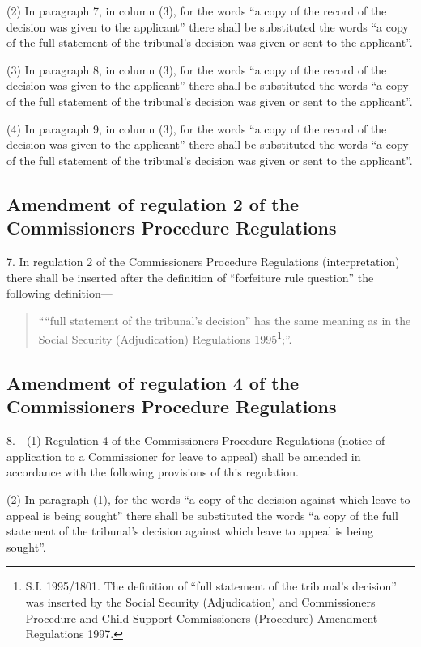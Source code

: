 \documentclass[12pt,a4paper]{article}
\begin{document}
(2) In paragraph 7, in column (3), for the words “a copy of the record of the decision was given to the applicant” there shall be substituted the words “a copy of the full statement of the tribunal’s decision was given or sent to the applicant”.

(3) In paragraph 8, in column (3), for the words “a copy of the record of the decision was given to the applicant” there shall be substituted the words “a copy of the full statement of the tribunal’s decision was given or sent to the applicant”.

(4) In paragraph 9, in column (3), for the words “a copy of the record of the decision was given to the applicant” there shall be substituted the words “a copy of the full statement of the tribunal’s decision was given or sent to the applicant”.

\subsection[7. Amendment of regulation 2 of the Commissioners Procedure Regulations]{Amendment of regulation 2 of the Commissioners Procedure Regulations}

7.  In regulation 2 of the Commissioners Procedure Regulations (interpretation) there shall be inserted after the definition of “forfeiture rule question” the following definition—
\begin{quotation}
““full statement of the tribunal’s decision” has the same meaning as in the Social Security (Adjudication) Regulations 1995\footnote{\frenchspacing S.I. 1995/1801. The definition of “full statement of the tribunal’s decision” was inserted by the Social Security (Adjudication) and Commissioners Procedure and Child Support Commissioners (Procedure) Amendment Regulations 1997.};”.
\end{quotation}

\subsection[8. Amendment of regulation 4 of the Commissioners Procedure Regulations]{Amendment of regulation 4 of the Commissioners Procedure Regulations}

8.—(1) Regulation 4 of the Commissioners Procedure Regulations (notice of application to a Commissioner for leave to appeal) shall be amended in accordance with the following provisions of this regulation.

(2) In paragraph (1), for the words “a copy of the decision against which leave to appeal is being sought” there shall be substituted the words “a copy of the full statement of the tribunal’s decision against which leave to appeal is being sought”.
\end{document}
